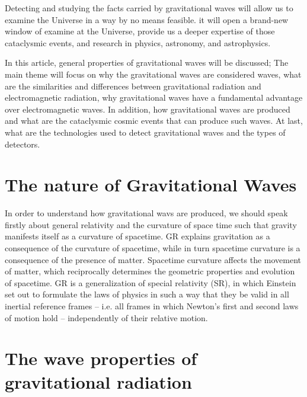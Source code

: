 \documentclass[11]{article}
\begin{document}
\vspace{5mm}
   Detecting and studying the facts carried by gravitational waves will allow us to examine the Universe in a way by no means feasible. it will open a brand-new window of examine at the Universe, provide us a deeper expertise of those cataclysmic events, and research in physics, astronomy, and astrophysics.

\vspace{5mm}
   In this article, general properties of gravitational waves will be discussed; The main theme will focus on why the gravitational waves are considered waves, what are the similarities and differences between gravitational radiation and electromagnetic radiation, why gravitational waves have a fundamental advantage over electromagnetic waves. In addition, how gravitational waves are produced and what are the cataclysmic cosmic events that can produce such waves. At last, what are the technologies used to detect gravitational waves and the types of detectors.
   
   \section{The nature of Gravitational Waves}
   
   In order to understand how gravitational wavs are produced, we should speak firstly about general relativity and the curvature of space time such that gravity manifests itself as a curvature of spacetime. GR explains gravitation as a consequence of the curvature of spacetime, while in turn spacetime curvature is a consequence of the presence of matter. Spacetime curvature affects the movement of matter, which reciprocally determines the geometric properties and evolution of spacetime.
GR is a generalization of special relativity (SR), in which Einstein set out to formulate
the laws of physics in such a way that they be valid in all inertial reference
frames – i.e. all frames in which Newton’s first and second laws of motion hold
– independently of their relative motion.
\section{The wave properties of gravitational radiation}
\end{document}
